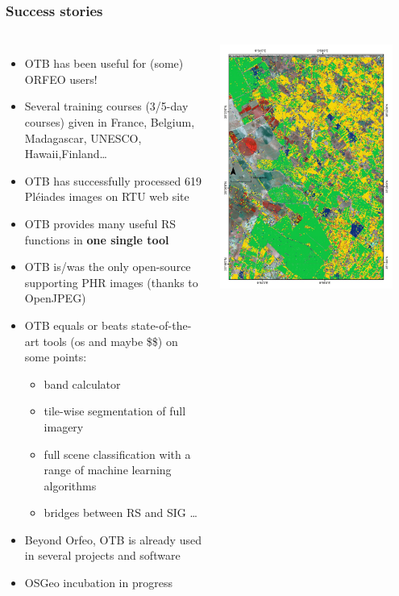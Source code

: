 \documentclass[8pt]{beamer}
\begin{document}
\begin{frame}
\frametitle{Success stories}
\begin{columns}
\begin{itemize}
\item OTB has been useful for (some) ORFEO users!
\item Several training courses (3/5-day courses) given in France, Belgium,
Madagascar, UNESCO, Hawaii,Finland\ldots
\item OTB has successfully processed 619 Pléiades
  images on RTU web site
\item OTB provides many useful RS functions in \textbf{one single tool}
\item OTB is/was the only open-source supporting PHR images (thanks to OpenJPEG)
\item OTB equals or beats state-of-the-art tools (os and maybe \$\$) on some points: 
  \begin{itemize}
  \item band calculator
  \item tile-wise segmentation of full imagery
  \item full scene classification with a range of machine learning algorithms
  \item bridges between RS and SIG \ldots
  \end{itemize}
\item Beyond Orfeo, OTB is already used in several projects and software
\item OSGeo incubation in progress
\end{itemize}
\includegraphics[width=0.9\textwidth]{images/resultats_ird.png}\\

\end{columns}
\end{frame}
\end{document}
